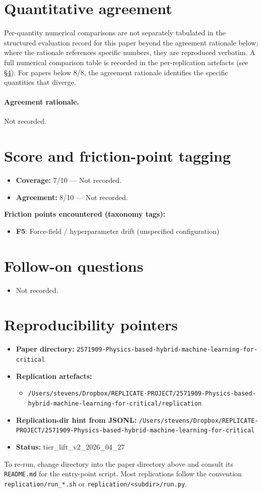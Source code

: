 \documentclass[11pt]{article}
\begin{document}
\section{Quantitative agreement}
Per-quantity numerical comparisons are not separately tabulated in the structured evaluation record for this paper beyond the agreement rationale below; where the rationale references specific numbers, they are reproduced verbatim. A full numerical comparison table is recorded in the per-replication artefacts (see \S\ref{sec:repro}). For papers below 8/8, the agreement rationale identifies the specific quantities that diverge.

\paragraph{Agreement rationale.} Not recorded.

\section{Score and friction-point tagging}\label{sec:friction}
\begin{itemize}
\item \textbf{Coverage:} 7/10 --- Not recorded.
\item \textbf{Agreement:} 8/10 --- Not recorded.
\end{itemize}

\noindent\textbf{Friction points encountered (taxonomy tags):}
\begin{itemize}
\item \textbf{F5}: Force-field / hyperparameter drift (unspecified configuration)
\end{itemize}

\section{Follow-on questions}
\begin{itemize}
\item Not recorded.
\end{itemize}

\section{Reproducibility pointers}\label{sec:repro}
\begin{itemize}
\item \textbf{Paper directory:} \texttt{2571909-Physics-based-hybrid-machine-learning-for-critical}
\item \textbf{Replication artefacts:}
\begin{itemize}
\item \texttt{/Users/stevens/Dropbox/REPLICATE-PROJECT/2571909-Physics-based-hybrid-machine-learning-for-critical/replication}
\end{itemize}
\item \textbf{Replication-dir hint from JSONL:} \texttt{/Users/stevens/Dropbox/REPLICATE-PROJECT/2571909-Physics-based-hybrid-machine-learning-for-critical}
\item \textbf{Status:} tier\_lift\_v2\_2026\_04\_27
\end{itemize}

To re-run, change directory into the paper directory above and consult its \texttt{README.md} for the entry-point script. Most replications follow the convention \texttt{replication/run\_*.sh} or \texttt{replication/<subdir>/run.py}.
\end{document}
